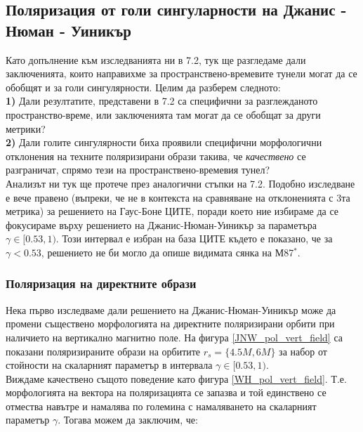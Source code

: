 \newpage 
\subsection{Поляризация от голи сингуларности на Джанис - Нюман - Уиникър}

Като допълнение към изследванията ни в 7.2, тук ще разгледаме дали заключенията, които направихме за пространствено-времевите тунели могат да се обобщят и за голи сингулярности. Целим да разберем следното:\\

\textbf{1)} Дали резултатите, представени в 7.2 са специфични за разглежданото пространство-време, или заключенията там могат да се обобщат за други метрики?\\

\textbf{2)} Дали голите сингулярности биха проявили специфични морфологични отклонения на техните поляризирани образи такива, че \emph{качествено} се разграничат, спрямо тези на пространствено-времевия тунел?\\

Анализът ни тук ще протече през аналогични стъпки на 7.2. Подобно изследване е вече правено (въпреки, че не в контекста на сравняване на отклоненията с 3та метрика) за решението на Гаус-Боне ЦИТЕ, поради което ние избираме да се фокусираме върху решението на Джанис-Нюман-Уиникър за параметъра $\gamma \in [0.53, 1)$. Този интервал е избран на база ЦИТЕ където е показано, че за $\gamma < 0.53$, решението не би могло да опише видимата сянка на М87$^*$. 

\subsubsection{Поляризация на директните образи}

Нека първо изследваме дали решението на Джанис-Нюман-Уиникър може да промени съществено морфологията на директните поляризирани орбити при наличието на вертикално магнитно поле. На фигура \ref{JNW_pol_vert_field} са показани поляризираните образи на орбитите $r_s = \{4.5M,6M\}$ за набор от стойности на скаларният параметър в интервала $\gamma\in[0.53,1)$.\\

Виждаме качествено същото поведение като фигура \ref{WH_pol_vert_field}. Т.е. морфологията на вектора на поляризацията се запазва и той единствено се отмества навътре и намалява по големина с намаляването на скаларният параметър $\gamma$. Тогава можем да заключим, че:\\

